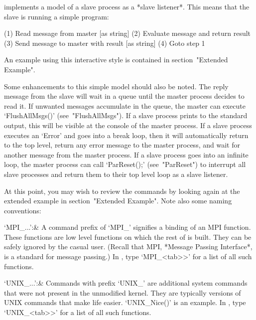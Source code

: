 

{\ParGAP} implements a model of a slave process as  a  *slave  listener*.
This means that the slave is running a simple program:

\begintt
  (1) Read message from master [as string]
  (2) Evaluate message and return result
  (3) Send message to master with result [as string]
  (4) Goto step 1
\endtt

An example using this interactive style is contained in section~"Extended
Example".

Some enhancements to this simple model should also be  noted.  The  reply
message from the slave will wait in a  queue  until  the  master  process
decides to read it. If unwanted messages accumulate  in  the  queue,  the
master can execute  `FlushAllMsgs()'  (see~"FlushAllMsgs").  If  a  slave
process prints to the standard  output,  this  will  be  visible  at  the
console of the master process. If a slave process executes an `Error' and
goes into a break loop, then it will  automatically  return  to  the  top
level, return any error message to  the  master  process,  and  wait  for
another message from the master process. If a slave process goes into  an
infinite loop, the master process can call `ParReset();' (see~"ParReset")
to interrupt all slave processes and return them to their top level  loop
as a slave listener.

At this point, you may wish to review the commands by  looking  again  at
the extended example in section~"Extended Example". Note also some naming
conventions:

\beginitems
`MPI_...':&
A command prefix of `MPI_' signifies a {\GAP} binding of an MPI function.
These functions are low level functions on which the rest of {\ParGAP} is
built. They can be safely ignored by the casual user. (Recall  that  MPI,
*Message Passing Interface*, is  a  standard  for  message  passing.)  In
{\ParGAP}, type `MPI_\<<tab>>' for a list of all such functions.

`UNIX_...':&
Commands with prefix `UNIX_' are additional system commands that were not
present in the  unmodified  {\GAP}  kernel.  They  are  typically  {\GAP}
versions of UNIX commands that make  life  easier.  `UNIX_Nice()'  is  an
example. In {\ParGAP}, type  `UNIX_\<<tab>>'  for  a  list  of  all  such
functions.

